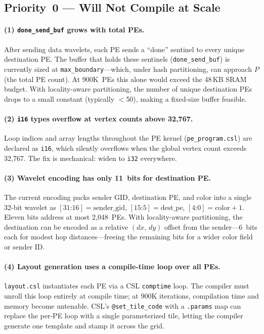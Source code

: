 \documentclass[11pt,letterpaper]{article}
\begin{document}
\subsection{Priority~0 --- Will Not Compile at Scale}

\paragraph{(1) \texttt{done\_send\_buf} grows with total PEs.}
After sending data wavelets, each PE sends a ``done'' sentinel
to every unique destination PE.
The buffer that holds these sentinels (\texttt{done\_send\_buf})
is currently sized at \texttt{max\_boundary}---which, under hash partitioning,
can approach $P$ (the total PE count).
At 900K~PEs this alone would exceed the 48\,KB SRAM budget.
With locality-aware partitioning, the number of unique destination PEs
drops to a small constant (typically $<$50), making a fixed-size buffer feasible.

\paragraph{(2) \texttt{i16} types overflow at vertex counts above 32{,}767.}
Loop indices and array lengths throughout the PE kernel
(\texttt{pe\_program.csl}) are declared as \texttt{i16},
which silently overflows when the global vertex count exceeds 32{,}767.
The fix is mechanical: widen to \texttt{i32} everywhere.

\paragraph{(3) Wavelet encoding has only 11~bits for destination PE.}
The current encoding packs sender GID, destination PE,
and color into a single 32-bit wavelet as
$[\text{31:16}] = \text{sender\_gid}$, $[\text{15:5}] = \text{dest\_pe}$,
$[\text{4:0}] = \text{color}+1$.
Eleven bits address at most 2{,}048~PEs.
With locality-aware partitioning, the destination can be encoded as
a relative $(dx,\,dy)$ offset from the sender---6~bits each for modest hop distances---freeing
the remaining bits for a wider color field or sender ID.

\paragraph{(4) Layout generation uses a compile-time loop over all PEs.}
\texttt{layout.csl} instantiates each PE via a CSL \texttt{comptime} loop.
The compiler must unroll this loop entirely at compile time;
at 900K iterations, compilation time and memory become untenable.
CSL's \texttt{@set\_tile\_code} with a \texttt{.params} map
can replace the per-PE loop with a single parameterized tile,
letting the compiler generate one template and stamp it across the grid.
\end{document}
